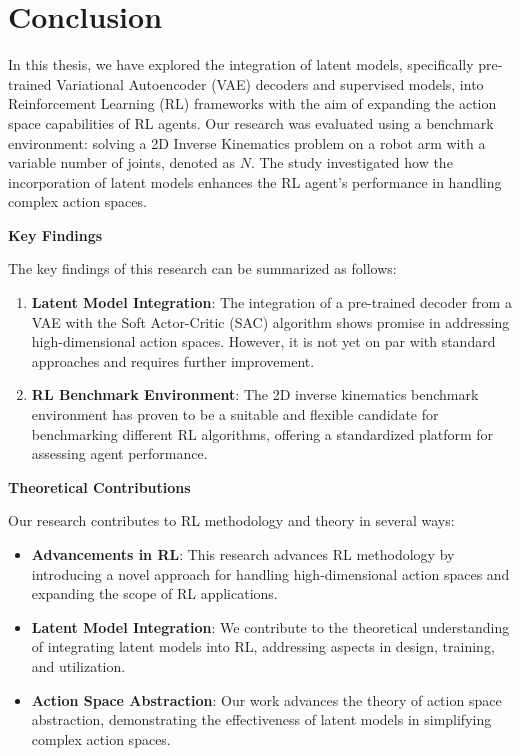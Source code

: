 \chapter{Conclusion}\label{chap:conclusion}

In this thesis, we have explored the integration of latent models, specifically pre-trained Variational Autoencoder (VAE) decoders and supervised models, into Reinforcement Learning (RL) frameworks with the aim of expanding the action space capabilities of RL agents. Our research was evaluated using a benchmark environment: solving a 2D Inverse Kinematics problem on a robot arm with a variable number of joints, denoted as $N$. The study investigated how the incorporation of latent models enhances the RL agent's performance in handling complex action spaces.

\textbf{Key Findings}

The key findings of this research can be summarized as follows:

\begin{enumerate}
    \item \textbf{Latent Model Integration}: The integration of a pre-trained decoder from a VAE with the Soft Actor-Critic (SAC) algorithm shows promise in addressing high-dimensional action spaces. However, it is not yet on par with standard approaches and requires further improvement.
    \item \textbf{RL Benchmark Environment}: The 2D inverse kinematics benchmark environment has proven to be a suitable and flexible candidate for benchmarking different RL algorithms, offering a standardized platform for assessing agent performance.
\end{enumerate}

\textbf{Theoretical Contributions}

Our research contributes to RL methodology and theory in several ways:

\begin{itemize}
    \item \textbf{Advancements in RL}: This research advances RL methodology by introducing a novel approach for handling high-dimensional action spaces and expanding the scope of RL applications.
    \item \textbf{Latent Model Integration}: We contribute to the theoretical understanding of integrating latent models into RL, addressing aspects in design, training, and utilization.
    \item \textbf{Action Space Abstraction}: Our work advances the theory of action space abstraction, demonstrating the effectiveness of latent models in simplifying complex action spaces.
\end{itemize}

